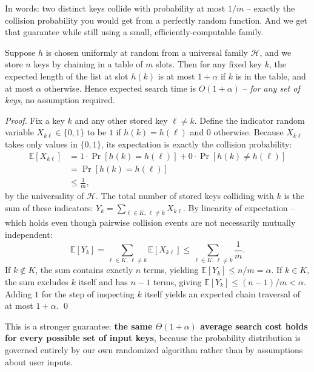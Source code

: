 In words: two distinct keys collide with probability at most $1/m$ -- exactly the collision probability you would get from a perfectly random function. And we get that guarantee while still using a small, efficiently-computable family.

\begin{theorem}
\label{ch11:universal-theorem}
Suppose $h$ is chosen uniformly at random from a universal family $\mathcal{H}$, and we store $n$ keys by chaining in a table of $m$ slots. Then for any fixed key $k$, the expected length of the list at slot $h(k)$ is at most $1 + \alpha$ if $k$ is in the table, and at most $\alpha$ otherwise. Hence expected search time is $O(1+\alpha)$ -- \emph{for any set of keys}, no assumption required.
\end{theorem}

\begin{proof}
Fix a key $k$ and any other stored key $\ell \neq k$. Define the indicator random variable $X_{k\ell} \in \{0,1\}$ to be $1$ if $h(k) = h(\ell)$ and $0$ otherwise. Because $X_{k\ell}$ takes only values in $\{0,1\}$, its expectation is exactly the collision probability:
\begin{align*}
  \mathbb{E}[X_{k\ell}] &= 1 \cdot \Pr[h(k)=h(\ell)] + 0 \cdot \Pr[h(k) \neq h(\ell)] \\
  &= \Pr[h(k)=h(\ell)] \\
  &\le \frac{1}{m},
\end{align*}
by the universality of $\mathcal{H}$. The total number of stored keys colliding with $k$ is the sum of these indicators: $Y_k = \sum_{\ell \in K,\, \ell \neq k} X_{k\ell}$. By linearity of expectation -- which holds even though pairwise collision events are not necessarily mutually independent:
\[
  \mathbb{E}[Y_k] = \sum_{\ell \in K,\, \ell \neq k} \mathbb{E}[X_{k\ell}] \le \sum_{\ell \in K,\, \ell \neq k} \frac{1}{m}.
\]
If $k \notin K$, the sum contains exactly $n$ terms, yielding $\mathbb{E}[Y_k] \le n/m = \alpha$. If $k \in K$, the sum excludes $k$ itself and has $n-1$ terms, giving $\mathbb{E}[Y_k] \le (n-1)/m < \alpha$. Adding $1$ for the step of inspecting $k$ itself yields an expected chain traversal of at most $1 + \alpha$. \qed
\end{proof}

This is a stronger guarantee: \textbf{the same $\Theta(1+\alpha)$ average search cost holds for every possible set of input keys}, because the probability distribution is governed entirely by our own randomized algorithm rather than by assumptions about user inputs.

